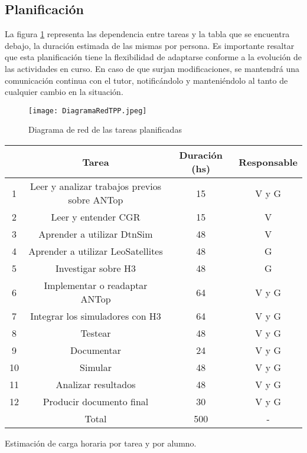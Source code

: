 \newpage
\subsection{Planificación}

La figura \ref{fig:dependencias} representa las dependencia entre tareas y la tabla que se encuentra debajo, la duración estimada de las mismas por persona. Es importante resaltar que esta planificación tiene la flexibilidad de adaptarse conforme a la evolución de las actividades en curso. En caso de que surjan modificaciones, se mantendrá una comunicación continua con el tutor, notificándolo y manteniéndolo al tanto de cualquier cambio en la situación.
\bigskip


\begin{figure}
    \centering
    \texttt{[image: DiagramaRedTPP.jpeg]}
    \caption{Diagrama de red de las tareas planificadas}
    \label{fig:dependencias}
\end{figure}

\centering
\begin{tabular}{|c|c|c|c|}
  \hline
    & Tarea & Duración (hs) & Responsable \\  
  \hline
  1 & Leer y analizar trabajos previos sobre ANTop   & 15  & V y G \\
  \hline
  2 & Leer y entender CGR   &  15  & V \\
  \hline
  3 & Aprender a utilizar DtnSim   & 48  & V  \\
  \hline
  4 & Aprender a utilizar LeoSatellites  &  48  & G \\
  \hline
  5 & Investigar sobre H3   & 48  & G \\
  \hline
  6 & Implementar o readaptar ANTop   &  64 & V y G  \\
  \hline
  7 & Integrar los simuladores con H3   & 64  & V y G \\
  \hline
  8 & Testear   &  48  & V y G \\
  \hline
  9 & Documentar   & 24 & V y G \\
  \hline
  10 & Simular   &  48 & V y G   \\
  \hline
  11 & Analizar resultados   & 48 & V y G  \\
  \hline
  12 & Producir documento final   &  30 & V y G  \\
  \hline
   & Total   &   500 & - \\
  \hline
\end{tabular}\par
\footnotesize{Estimación de carga horaria por tarea y por alumno.}\\






